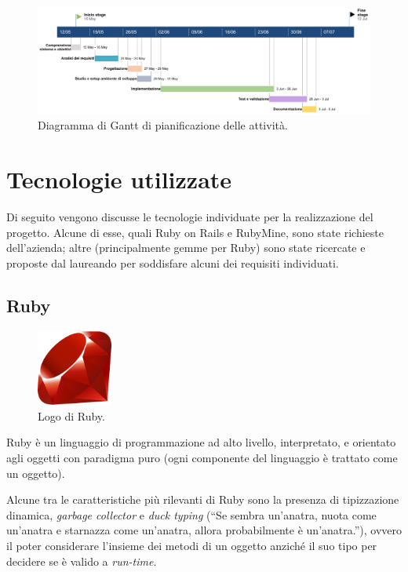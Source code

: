     
\begin{figure}[h!]
    \includegraphics[width=\textwidth]{figures/gantt.png}
    \caption[Diagramma di Gantt di pianificazione delle attività]{Diagramma di Gantt di pianificazione delle attività.
    \label{fig:gantt}}
\end{figure}    

\section{Tecnologie utilizzate}
Di seguito vengono discusse le tecnologie individuate per la realizzazione del progetto. Alcune di esse, quali Ruby on Rails e RubyMine, sono state richieste dell'azienda; altre (principalmente gemme per Ruby) sono state ricercate e proposte dal laureando per soddisfare alcuni dei requisiti individuati.

\subsection{Ruby}
\begin{figure}[h!]
    \centering
    \includegraphics[height=2.5cm]{figures/ruby.png}
    \caption[Logo di Ruby]{Logo di Ruby.
    \label{fig:ruby}}
\end{figure}
Ruby è un linguaggio di programmazione ad alto livello, interpretato, e orientato agli oggetti con paradigma puro (ogni componente del linguaggio è trattato come un oggetto)\cite{Ruby}. 

Alcune tra le caratteristiche più rilevanti di Ruby sono la presenza di tipizzazione dinamica, \textit{garbage collector} e \textit{duck typing} (``Se sembra un'anatra, nuota come un'anatra e starnazza come un'anatra, allora probabilmente è un'anatra.''), ovvero il poter considerare l'insieme dei metodi di un oggetto anziché il suo tipo per decidere se è valido a \textit{run-time}.

